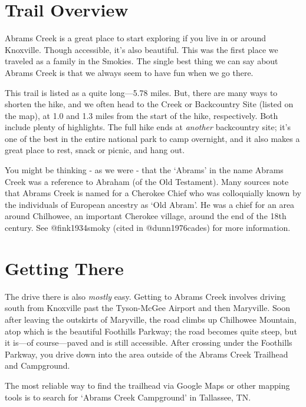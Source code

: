 \documentclass[
]{book}
\begin{document}
\hypertarget{trail-overview}{%
\section{Trail Overview}\label{trail-overview}}

Abrams Creek is a great place to start exploring if you live in or around Knoxville.
Though accessible, it's also beautiful. This was the first place we traveled as
a family in the Smokies. The single best thing we can say about Abrams Creek is
that we always seem to have fun when we go there.

This trail is listed as a quite long---5.78 miles.
But, there are many ways to shorten the hike, and we often head to the Creek or
Backcountry Site (listed on the map), at 1.0 and 1.3 miles from the start of
the hike, respectively. Both include plenty of highlights. The full hike ends
at \emph{another} backcountry site; it's one of the best in the entire national
park to camp overnight, and it also makes a great place to rest, snack or
picnic, and hang out.

\begin{rmdhistory}
You might be thinking - as we were - that the `Abrams' in the name
Abrams Creek was a reference to Abraham (of the Old Testament). Many
sources note that Abrams Creek is named for a Cherokee Chief who was
colloquially known by the individuals of European ancestry as `Old
Abram'. He was a chief for an area around Chilhowee, an important
Cherokee village, around the end of the 18th century. See @fink1934smoky
(cited in @dunn1976cades) for more information.
\end{rmdhistory}

\hypertarget{getting-there}{%
\section{Getting There}\label{getting-there}}

The drive there is also \emph{mostly} easy. Getting to Abrams Creek involves driving
south from Knoxville past the Tyson-McGee Airport and then Maryville.
Soon after leaving the outskirts of Maryville, the road climbs up Chilhowee
Mountain, atop which is the beautiful Foothills Parkway; the road becomes quite
steep, but it is---of course---paved and is still accessible. After crossing
under the Foothills Parkway, you drive down into the area outside of the Abrams
Creek Trailhead and Campground.

The most reliable way to find the trailhead via Google Maps or other mapping
tools is to search for `Abrams Creek Campground' in Tallassee, TN.
\end{document}

